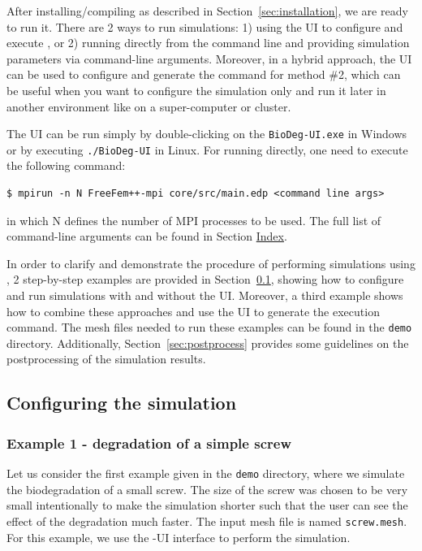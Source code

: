 After installing/compiling \biodeg{} as described in Section~\ref{sec:installation}, we are ready to run it. There are 2 ways to run \biodeg{} simulations: 1) using the UI to configure and execute \biodeg{}, or 2) running \biodeg{} directly from the command line and providing simulation parameters via command-line arguments. Moreover, in a hybrid approach, the UI can be used to configure and generate the command for method \#2, which can be useful when you want to configure the simulation only and run it later in another environment like on a super-computer or cluster.

The UI can be run simply by double-clicking on the \verb|BioDeg-UI.exe| in Windows or by executing \verb|./BioDeg-UI| in Linux. For running \biodeg{} directly, one need to execute the following command:
\begin{verbatim}
$ mpirun -n N FreeFem++-mpi core/src/main.edp <command line args>
\end{verbatim}
in which N defines the number of MPI processes to be used. The full list of command-line arguments can be found in Section \hyperref[sec:index]{Index}.

In order to clarify and demonstrate the procedure of performing simulations using \biodeg{}, 2 step-by-step examples are provided in Section~\ref{sec:config}, showing how to configure and run simulations with and without the UI. Moreover, a third example shows how to combine these approaches and use the UI to generate the execution command. The mesh files needed to run these examples can be found in the \verb|demo| directory. Additionally, Section~\ref{sec:postprocess} provides some guidelines on the postprocessing of the  \biodeg{} simulation results.

\subsection{Configuring the simulation} \label{sec:config}


\subsubsection{Example 1 - degradation of a simple screw}\label{sec:example1}

Let us consider the first example given in the \verb|demo| directory, where we simulate the biodegradation of a small screw. The size of the screw was chosen to be very small intentionally to make the simulation shorter such that the user can see the effect of the degradation much faster. The input mesh file is named \verb|screw.mesh|. For this example, we use the \biodeg{}-UI interface to perform the simulation.

